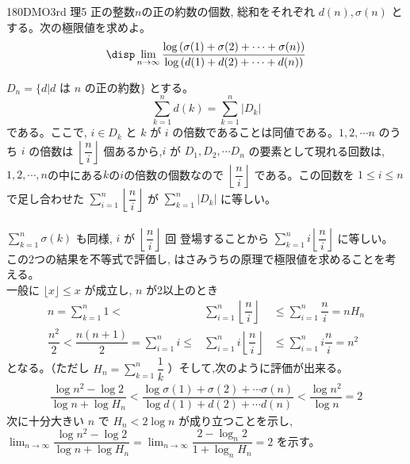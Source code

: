 \begin{thm}{180}{}{DMO3rd 理5}
 正の整数$n$の正の約数の個数, 総和をそれぞれ $d(n), \sigma (n)$ とする。次の極限値を求めよ。
 \[\disp\lim_{n\to \infty}\dfrac{\log{(\sigma(1) +\sigma(2) +\cdots +\sigma (n))}}{\log{(d(1)+d(2)+\cdots +d(n))}}\]
\end{thm}

$D_n=\{d| \mbox{$d$ は $n$ の正の約数}\}$ とする。
\[\displaystyle\sum_{k=1}^n d(k) = \displaystyle\sum_{k=1}^n|D_k|\] である。ここで, $i\in D_k$ と $k$ が $i$ の倍数であることは同値である。$1,2,\cdots n$ のうち $i$ の倍数は $\left\lfloor\dfrac{n}{i}\right\rfloor$ 個あるから,$i$ が $D_1, D_2, \cdots D_n$ の要素として現れる回数は, $1,2,\cdots, n$の中にある$k$の$i$の倍数の個数なので $\left\lfloor\dfrac{n}{i}\right\rfloor$ である。この回数を $1\le i\le n$ で足し合わせた $\displaystyle\sum_{i=1}^n \left\lfloor\dfrac{n}{i}\right\rfloor$ が $\displaystyle\sum_{k=1}^n |D_k|$ に等しい。 \\
\\
$\displaystyle\sum_{k=1}^n \sigma (k)$ も同様, $i$ が $\left\lfloor\dfrac{n}{i}\right\rfloor$ 回 登場することから $\displaystyle\sum_{k=1}^n i\left\lfloor\dfrac{n}{i}\right\rfloor$ に等しい。 \\
この2つの結果を不等式で評価し, はさみうちの原理で極限値を求めることを考える。\\
一般に $\lfloor x\rfloor\le x$ が成立し, $n$ が2以上のとき
\begin{eqnarray*}
n=\displaystyle\sum_{k=1}^n 1 < &\displaystyle\sum_{i=1}^n \left\lfloor\dfrac{n}{i}\right\rfloor& \le\displaystyle\sum_{i=1}^n \dfrac{n}{i}=nH_n\\
\dfrac{n^2}{2}<\dfrac{n(n+1)}{2}=
\displaystyle\sum_{i=1}^n i \le &\displaystyle\sum_{i=1}^n i\left\lfloor\dfrac{n}{i}\right\rfloor & \le \displaystyle\sum_{i=1}^n i\dfrac{n}{i} =n^2
\end{eqnarray*}
となる。（ただし $H_n=\displaystyle\sum_{k=1}^n\dfrac{1}{k}$ ）そして,次のように評価が出来る。
\begin{eqnarray*}
\dfrac{\log{n^2}-\log{2}}{\log{n}+\log{H_n}} < \dfrac{\log{\sigma(1) +\sigma (2)+\cdots \sigma (n)}}{\log{d(1)+d(2)+\cdots d(n)}} < \dfrac{\log{n^2}}{\log{n}} = 2
\end{eqnarray*}
次に十分大きい $n$ で $H_n<2\log{n}$ が成り立つことを示し,\\
$\displaystyle\lim_{n\to\infty}\dfrac{\log{n^2}-\log{2}}{\log{n}+\log{H_n}}=\displaystyle\lim_{n\to\infty}\dfrac{2-\log_n{2}}{1+\log_n{H_n}}=2$ を示す。\\
